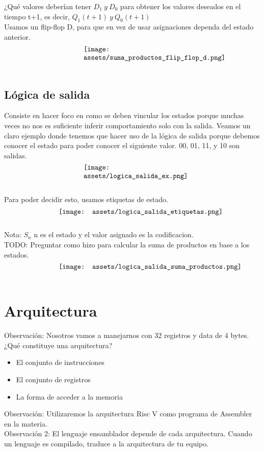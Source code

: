 \documentclass[10pt,a4paper]{article}
\begin{document}
¿Qué valores deberían tener \(D_{1} \ y \ D_{0}\) para obtener los valores deseados en el tiempo t+1, es decir, \(Q_{1}(t+1) \ y \ Q_{0}(t+1)\) \\
Usamos un flip-flop D, para que en vez de usar asignaciones dependa del estado anterior.
\[\begin{minipage}[b]{0.4\textwidth}
    \texttt{[image: assets/suma\_productos\_flip\_flop\_d.png]}
    \label{fig:suma_productos_flip_flop_d}
\end{minipage}\]
\subsection*{Lógica de salida}
Consiste en hacer foco en como se deben vincular los estados porque muchas veces no nos es suficiente inferir comportamiento solo con la salida.
Veamos un claro ejemplo donde tenemos que hacer uso de la lógica de salida porque debemos conocer el estado para poder conocer el siguiente valor. 
00, 01, 11, y 10 son salidas.
\[\begin{minipage}[b]{0.4\textwidth}
    \texttt{[image: assets/logica\_salida\_ex.png]}
    \label{fig:logica_salida_ex}
\end{minipage}\]
Para poder decidir esto, usamos etiquetas de estado.
\[\begin{minipage}[b]{0.6\textwidth}
    \texttt{[image: assets/logica\_salida\_etiquetas.png]}
    \label{fig:logica_salida_etiquetas}
\end{minipage}\]
Nota: \(S_{n}\) n es el estado y el valor asignado es la codificacion. \\
TODO: Preguntar como hizo para calcular la suma de productos en base a los estados.
\[\begin{minipage}[b]{0.6\textwidth}
    \texttt{[image: assets/logica\_salida\_suma\_productos.png]}
    \label{fig:logica_salida_suma_productos}
\end{minipage}\]
\section{Arquitectura}
Observación: Nosotros vamos a manejarnos con 32 registros y data de 4 bytes.\\

¿Qué constituye una arquitectura?
\begin{itemize}
    \item El conjunto de instrucciones
    \item El conjunto de registros
    \item La forma de acceder a la memoria
\end{itemize}
Observación: Utilizaremos la arquitectura Risc V como programa de Assembler en la materia. \\
Observación 2: El lenguaje ensamblador depende de cada arquitectura. Cuando un lenguaje es compilado, traduce a la arquitectura de tu equipo.
\end{document}
